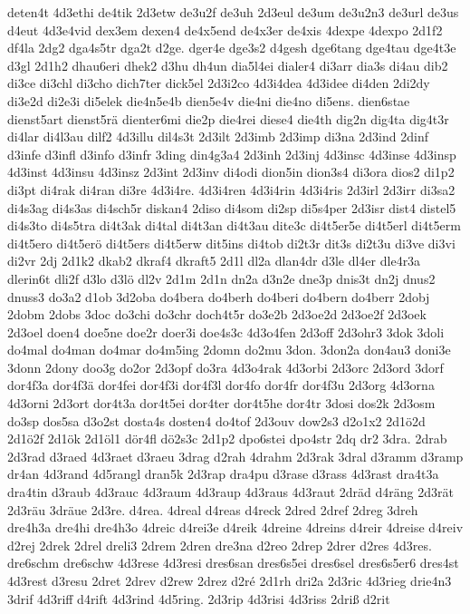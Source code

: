 {deten4t
4d3ethi
de4tik
2d3etw
de3u2f
de3uh
2d3eul
de3um
de3u2n3
de3url
de3us
d4eut
4d3e4vid
dex3em
dexen4
de4x5end
de4x3er
de4xis
4dexpe
4dexpo
2d1f2
df4la
2dg2
dga4s5tr
dga2t
d2ge.
dger4e
dge3s2
d4gesh
dge6tang
dge4tau
dge4t3e
d3gl
2d1h2
dhau6eri
dhek2
d3hu
dh4un
dia5l4ei
dialer4
di3arr
dia3s
di4au
dib2
di3ce
di3chl
di3cho
dich7ter
dick5el
2d3i2co
4d3i4dea
4d3idee
di4den
2di2dy
di3e2d
di2e3i
di5elek
die4n5e4b
dien5e4v
die4ni
die4no
di5ens.
dien6stae
dienst5art
dienst5rä
dienter6mi
die2p
die4rei
diese4
die4th
dig2n
dig4ta
dig4t3r
di4lar
di4l3au
dilf2
4d3illu
dil4s3t
2d3ilt
2d3imb
2d3imp
di3na
2d3ind
2dinf
d3infe
d3infl
d3info
d3infr
3ding
din4g3a4
2d3inh
2d3inj
4d3insc
4d3inse
4d3insp
4d3inst
4d3insu
4d3insz
2d3int
2d3inv
di4odi
dion5in
dion3s4
di3ora
dios2
di1p2
di3pt
di4rak
di4ran
di3re
4d3i4re.
4d3i4ren
4d3i4rin
4d3i4ris
2d3irl
2d3irr
di3sa2
di4s3ag
di4s3as
di4sch5r
diskan4
2diso
di4som
di2sp
di5s4per
2d3isr
dist4
distel5
di4s3to
di4s5tra
di4t3ak
di4tal
di4t3an
di4t3au
dite3c
di4t5er5e
di4t5erl
di4t5erm
di4t5ero
di4t5erö
di4t5ers
di4t5erw
dit5ins
di4tob
di2t3r
dit3s
di2t3u
di3ve
di3vi
di2vr
2dj
2d1k2
dkab2
dkraf4
dkraft5
2d1l
dl2a
dlan4dr
d3le
dl4er
dle4r3a
dlerin6t
dli2f
d3lo
d3lö
dl2v
2d1m
2d1n
dn2a
d3n2e
dne3p
dnis3t
dn2j
dnus2
dnuss3
do3a2
d1ob
3d2oba
do4bera
do4berh
do4beri
do4bern
do4berr
2dobj
2dobm
2dobs
3doc
do3chi
do3chr
doch4t5r
do3e2b
2d3oe2d
2d3oe2f
2d3oek
2d3oel
doen4
doe5ne
doe2r
doer3i
doe4s3c
4d3o4fen
2d3off
2d3ohr3
3dok
3doli
do4mal
do4man
do4mar
do4m5ing
2domn
do2mu
3don.
3don2a
don4au3
doni3e
3donn
2dony
doo3g
do2or
2d3opf
do3ra
4d3o4rak
4d3orbi
2d3orc
2d3ord
3dorf
dor4f3a
dor4f3ä
dor4fei
dor4f3i
dor4f3l
dor4fo
dor4fr
dor4f3u
2d3org
4d3orna
4d3orni
2d3ort
dor4t3a
dor4t5ei
dor4ter
dor4t5he
dor4tr
3dosi
dos2k
2d3osm
do3sp
dos5sa
d3o2st
dosta4s
dosten4
do4tof
2d3ouv
dow2s3
d2o1x2
2d1ö2d
2d1ö2f
2d1ök
2d1öl1
dör4fl
dö2s3c
2d1p2
dpo6stei
dpo4str
2dq
dr2
3dra.
2drab
2d3rad
d3raed
4d3raet
d3raeu
3drag
d2rah
4drahm
2d3rak
3dral
d3ramm
d3ramp
dr4an
4d3rand
4d5rangl
dran5k
2d3rap
dra4pu
d3rase
d3rass
4d3rast
dra4t3a
dra4tin
d3raub
4d3rauc
4d3raum
4d3raup
4d3raus
4d3raut
2dräd
d4räng
2d3rät
2d3räu
3dräue
2d3re.
d4rea.
4dreal
d4reas
d4reck
2dred
2dref
2dreg
3dreh
dre4h3a
dre4hi
dre4h3o
4dreic
d4rei3e
d4reik
4dreine
4dreins
d4reir
4dreise
d4reiv
d2rej
2drek
2drel
dreli3
2drem
2dren
dre3na
d2reo
2drep
2drer
d2res
4d3res.
dre6schm
dre6schw
4d3rese
4d3resi
dres6san
dres6s5ei
dres6sel
dres6s5er6
dres4st
4d3rest
d3resu
2dret
2drev
d2rew
2drez
d2ré
2d1rh
dri2a
2d3ric
4d3rieg
drie4n3
3drif
4d3riff
d4rift
4d3rind
4d5ring.
2d3rip
4d3risi
4d3riss
2driß
d2rit
}
